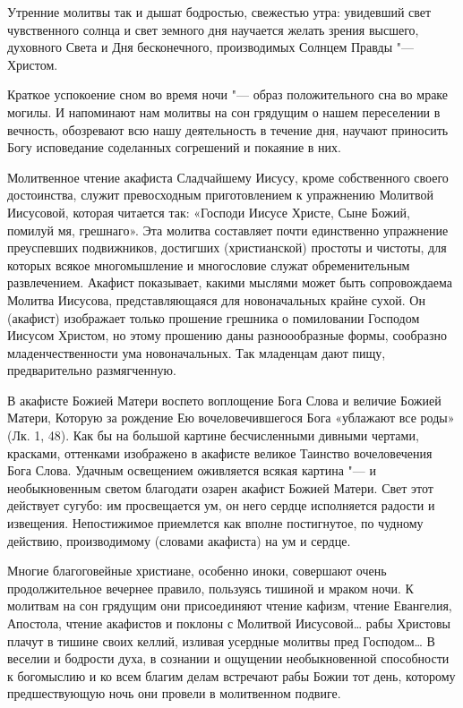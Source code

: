 \begin{mymulticols}
Утренние молитвы так и дышат бодростью, свежестью утра: увидевший свет чувственного солнца и свет земного дня научается желать зрения высшего, духовного Света и Дня бесконечного, производимых Солнцем Правды "--- Христом.

Краткое успокоение сном во время ночи "--- образ положительного сна во мраке могилы. И напоминают нам молитвы на сон грядущим о нашем переселении в вечность, обозревают всю нашу деятельность в течение дня, научают приносить Богу исповедание соделанных согрешений и покаяние в них.

Молитвенное чтение акафиста Сладчайшему Иисусу, кроме собственного своего достоинства, служит превосходным приготовлением к упражнению Молитвой Иисусовой, которая читается так: «Господи Иисусе Христе, Сыне Божий, помилуй мя, грешнаго». Эта молитва составляет почти единственно упражнение преуспевших подвижников, достигших (христианской) простоты и чистоты, для которых всякое многомышление и многословие служат обременительным развлечением. Акафист показывает, какими мыслями может быть сопровождаема Молитва Иисусова, представляющаяся для новоначальных крайне сухой. Он (акафист) изображает только прошение грешника о помиловании Господом Иисусом Христом, но этому прошению даны разноообразные формы, сообразно младенчественности ума новоначальных. Так младенцам дают пищу, предварительно размягченную.

В акафисте Божией Матери воспето воплощение Бога Слова и величие Божией Матери, Которую за рождение Ею вочеловечившегося Бога «ублажают все роды» (Лк. 1, 48). Как бы на большой картине бесчисленными дивными чертами, красками, оттенками изображено в акафисте великое Таинство вочеловечения Бога Слова. Удачным освещением оживляется всякая картина "--- и необыкновенным светом благодати озарен акафист Божией Матери. Свет этот действует сугубо: им просвещается ум, он него сердце исполняется радости и извещения. Непостижимое приемлется как вполне постигнутое, по чудному действию, производимому (словами акафиста) на ум и сердце.

Многие благоговейные христиане, особенно иноки, совершают очень продолжительное вечернее правило, пользуясь тишиной и мраком ночи. К молитвам на сон грядущим они присоединяют чтение кафизм, чтение Евангелия, Апостола, чтение акафистов и поклоны с Молитвой Иисусовой… рабы Христовы плачут в тишине своих келлий, изливая усердные молитвы пред Господом… В веселии и бодрости духа, в сознании и ощущении необыкновенной способности к богомыслию и ко всем благим делам встречают рабы Божии тот день, которому предшествующую ночь они провели в молитвенном подвиге.


\end{mymulticols}

